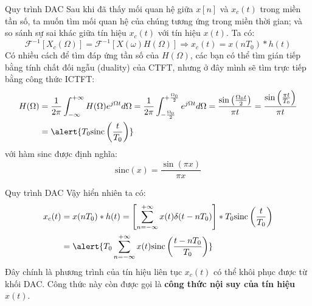 \documentclass[8pt]{beamer}
\begin{document}
\begin{frame}{Quy trình DAC}
Sau khi đã thấy mối quan hệ giữa $x[n]$ và $x_{c}(t)$ trong miền tần số, ta muốn tìm mối quan hệ của chúng tương ứng trong miền thời gian; và so sánh sự sai khác giữa tín hiệu $x_{c}(t)$ với tín hiệu $x(t)$.
Ta có:
$$\mathscr{F}^{-1}[X_{c}(\Omega)]=\mathscr{F}^{-1}[X(\omega)H(\Omega)]\Rightarrow x_{c}(t)=x(nT_{0})*h(t)$$
Có nhiều cách để tìm đáp ứng tần số của $H(\Omega)$, các bạn có thể tìm gián tiếp bằng tính chất đối ngẫu (duality) của CTFT, nhưng ở đây mình sẽ tìm trực tiếp bằng công thức ICTFT:
\begin{equation*}
\begin{split}
	H(\Omega)&=\frac{1}{2\pi}\int_{-\infty}^{+\infty}H(\Omega)e^{j\Omega t}d\Omega=\frac{1}{2\pi}\int_{-\frac{\Omega_{0}}{2}}^{+\frac{\Omega_{0}}{2}}e^{j\Omega t}d\Omega=\frac{\sin\left(\frac{\Omega_{0}t}{2}\right)}{\pi t}=\frac{\sin\left(\frac{\pi t}{T_{0}}\right)}{\pi t}\\
		 &= \alert{T_{0}\text{sinc}\left(\frac{t}{T_{0}}\right)}
\end{split}
\end{equation*}
với hàm sinc được định nghĩa: $$\text{sinc}(x)=\frac{\sin(\pi x)}{\pi x}$$ 
\end{frame}
\begin{frame}{Quy trình DAC}
Vậy hiển nhiên ta có:
\begin{equation*}
\begin{split}
	x_{c}(t)&=x(nT_{0})*h(t)=\left[\sum_{n=-\infty}^{+\infty}x(t)\delta(t-nT_{0})\right]*T_{0}\text{sinc}\left(\frac{t}{T_{0}}\right)\\ &=\alert{T_{0}\sum_{n=-\infty}^{+\infty}x(t)\text{sinc}\left(\frac{t-nT_{0}}{T_{0}}\right)}
\end{split}
\end{equation*}
Đây chính là phương trình của tín hiệu liên tục $x_{c}(t)$ có thể khôi phục được từ khối DAC.
Công thức này còn được gọi là \textbf{công thức nội suy của tín hiệu $x(t)$}.
\end{frame}
\end{document}
